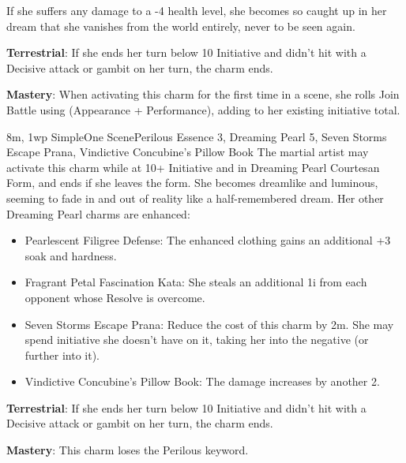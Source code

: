 If she suffers any damage to a -4 health level, she becomes so caught up in her dream that she vanishes from the world entirely, never to be seen again.

\textbf{Terrestrial}: If she ends her turn below 10 Initiative and didn't hit with a Decisive attack or gambit on her turn, the charm ends.

\textbf{Mastery}: When activating this charm for the first time in a scene, she rolls Join Battle using (Appearance + Performance), adding to her existing initiative total.

{8m, 1wp}
{Simple}{One Scene}{Perilous}
{Essence 3, Dreaming Pearl 5, Seven Storms Escape Prana, Vindictive Concubine's Pillow Book}
The martial artist may activate this charm while at 10+ Initiative and in Dreaming Pearl Courtesan Form, and ends if she leaves the form. She becomes dreamlike and luminous, seeming to fade in and out of reality like a half-remembered dream. Her other Dreaming Pearl charms are enhanced:

\begin{itemize}
  \item Pearlescent Filigree Defense: The enhanced clothing gains an additional +3 soak and hardness.
  \item Fragrant Petal Fascination Kata: She steals an additional 1i from each opponent whose Resolve is overcome.
  \item Seven Storms Escape Prana: Reduce the cost of this charm by 2m. She may spend initiative she doesn't have on it, taking her into the negative (or further into it).
  \item Vindictive Concubine's Pillow Book: The damage increases by another 2.
\end{itemize}

\textbf{Terrestrial}: If she ends her turn below 10 Initiative and didn't hit with a Decisive attack or gambit on her turn, the charm ends.

\textbf{Mastery}: This charm loses the Perilous keyword.
